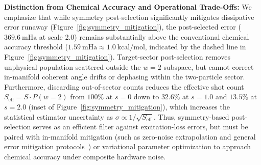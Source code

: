 \documentclass[aps,pra,reprint,superscriptaddress,floatfix,nofootinbib]{revtex4-2}
\begin{document}
\textbf{Distinction from Chemical Accuracy and Operational Trade-Offs:} 
We emphasize that while symmetry post-selection significantly mitigates dissipative error runaway (Figure~\ref{fig:symmetry_mitigation}), the post-selected error ($369.6\ \text{mHa}$ at scale 2.0) remains substantially above the conventional chemical accuracy threshold ($1.59\ \text{mHa} \approx 1.0\ \text{kcal/mol}$, indicated by the dashed line in Figure~\ref{fig:symmetry_mitigation}). Target-sector post-selection removes unphysical population scattered outside the $w=2$ subspace, but cannot correct in-manifold coherent angle drifts or dephasing within the two-particle sector. Furthermore, discarding out-of-sector counts reduces the effective shot count $S_{\text{eff}} = S \cdot P(w=2)$ from $100\%$ at $s=0$ down to $32.6\%$ at $s=1.0$ and $13.5\%$ at $s=2.0$ (inset of Figure~\ref{fig:symmetry_mitigation}), which increases the statistical estimator uncertainty as $\sigma \propto 1/\sqrt{S_{\text{eff}}}$. Thus, symmetry-based post-selection serves as an efficient filter against excitation-loss errors, but must be paired with in-manifold mitigation (such as zero-noise extrapolation and general error mitigation protocols~\cite{Temme2017,Endo2018}) or variational parameter optimization to approach chemical accuracy under composite hardware noise.
\end{document}
